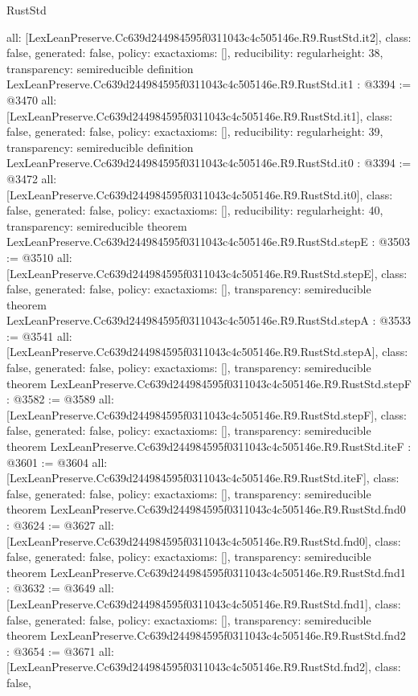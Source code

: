 \begin{lexlean}{RustStd}
\begin{coremodule}
{  all: [LexLeanPreserve.Cc639d244984595f0311043c4c505146e.R9.RustStd.it2],
  class: false,
  generated: false,
  policy: exact{axioms: []},
  reducibility: regular{height: 38},
  transparency: semireducible
}
definition LexLeanPreserve.Cc639d244984595f0311043c4c505146e.R9.RustStd.it1 : @3394 := @3470 {
  all: [LexLeanPreserve.Cc639d244984595f0311043c4c505146e.R9.RustStd.it1],
  class: false,
  generated: false,
  policy: exact{axioms: []},
  reducibility: regular{height: 39},
  transparency: semireducible
}
definition LexLeanPreserve.Cc639d244984595f0311043c4c505146e.R9.RustStd.it0 : @3394 := @3472 {
  all: [LexLeanPreserve.Cc639d244984595f0311043c4c505146e.R9.RustStd.it0],
  class: false,
  generated: false,
  policy: exact{axioms: []},
  reducibility: regular{height: 40},
  transparency: semireducible
}
theorem LexLeanPreserve.Cc639d244984595f0311043c4c505146e.R9.RustStd.stepE : @3503 := @3510 {
  all: [LexLeanPreserve.Cc639d244984595f0311043c4c505146e.R9.RustStd.stepE],
  class: false,
  generated: false,
  policy: exact{axioms: []},
  transparency: semireducible
}
theorem LexLeanPreserve.Cc639d244984595f0311043c4c505146e.R9.RustStd.stepA : @3533 := @3541 {
  all: [LexLeanPreserve.Cc639d244984595f0311043c4c505146e.R9.RustStd.stepA],
  class: false,
  generated: false,
  policy: exact{axioms: []},
  transparency: semireducible
}
theorem LexLeanPreserve.Cc639d244984595f0311043c4c505146e.R9.RustStd.stepF : @3582 := @3589 {
  all: [LexLeanPreserve.Cc639d244984595f0311043c4c505146e.R9.RustStd.stepF],
  class: false,
  generated: false,
  policy: exact{axioms: []},
  transparency: semireducible
}
theorem LexLeanPreserve.Cc639d244984595f0311043c4c505146e.R9.RustStd.iteF : @3601 := @3604 {
  all: [LexLeanPreserve.Cc639d244984595f0311043c4c505146e.R9.RustStd.iteF],
  class: false,
  generated: false,
  policy: exact{axioms: []},
  transparency: semireducible
}
theorem LexLeanPreserve.Cc639d244984595f0311043c4c505146e.R9.RustStd.fnd0 : @3624 := @3627 {
  all: [LexLeanPreserve.Cc639d244984595f0311043c4c505146e.R9.RustStd.fnd0],
  class: false,
  generated: false,
  policy: exact{axioms: []},
  transparency: semireducible
}
theorem LexLeanPreserve.Cc639d244984595f0311043c4c505146e.R9.RustStd.fnd1 : @3632 := @3649 {
  all: [LexLeanPreserve.Cc639d244984595f0311043c4c505146e.R9.RustStd.fnd1],
  class: false,
  generated: false,
  policy: exact{axioms: []},
  transparency: semireducible
}
theorem LexLeanPreserve.Cc639d244984595f0311043c4c505146e.R9.RustStd.fnd2 : @3654 := @3671 {
  all: [LexLeanPreserve.Cc639d244984595f0311043c4c505146e.R9.RustStd.fnd2],
  class: false,
}
\end{coremodule}
\end{lexlean}
